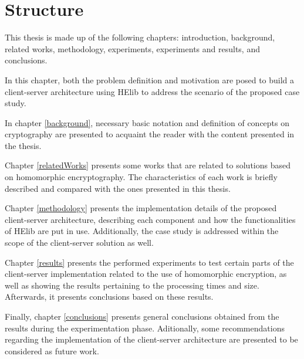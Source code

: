 \section{Structure}
This thesis is made up of the following chapters: introduction, background, related works, methodology, experiments, experiments and results, and conclusions.

In this chapter, both the problem definition and motivation are posed to build a client-server architecture using HElib to address the scenario of the proposed case study.

In chapter \ref{background}, necessary basic notation and definition of concepts on cryptography are presented to acquaint the reader with the content presented in the thesis.

Chapter \ref{relatedWorks} presents some works that are related to solutions based on homomorphic encryptography. The characteristics of each work is briefly described and compared with the ones presented in this thesis.

Chapter \ref{methodology} presents the implementation details of the proposed client-server architecture, describing each component and how the functionalities of HElib are put in use. Additionally, the case study is addressed within the scope of the client-server solution as well.

Chapter \ref{results} presents the performed experiments to test certain parts of the client-server implementation related to the use of homomorphic encryption, as well as showing the results pertaining to the processing times and size. Afterwards, it presents conclusions based on these results.

Finally, chapter \ref{conclusions} presents general conclusions obtained from the results during the experimentation phase. Aditionally, some recommendations regarding the implementation of the client-server architecture are presented to be considered as future work.

\clearpage
